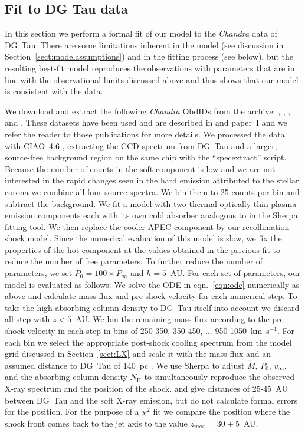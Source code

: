\subsection{Fit to DG Tau data}
In this section we perform a formal fit of our model to the \emph{Chandra} data of DG~Tau. There are some limitations inherent in the model (see discussion in Section~\ref{sect:modelassumptions}) and in the fitting process (see below), but the resulting best-fit model reproduces the observations with parameters that are in line with the observational limits discussed above and thus shows that our model is consistent with the data.

We download and extract the following \emph{Chandra} ObdIDs from the archive: , , , and . These datasets have been used and are described in \citet{2008A&A...478..797G,2008A&A...488L..13S} and paper~I and we refer the reader to those publications for more details. We processed the data with CIAO~4.6 \citep{2006SPIE.6270E..60F}, extracting the CCD spectrum from DG~Tau and a larger, source-free background region on the same chip with the ``specextract'' script. Because the number of counts in the soft component is low and we are not interested in the rapid changes seen in the hard emission attributed to the stellar corona \citep{2008A&A...478..797G} we combine all four source spectra. We bin them to 25 counts per bin and subtract the background. We fit a model with two thermal optically thin plasma emission components \citep[APEC][]{2012ApJ...756..128F} each with its own cold absorber analogous to \citep{2008A&A...478..797G} in the Sherpa fitting tool. We then replace the cooler APEC component by our recollimation shock model. Since the numerical evaluation of this model is slow, we fix the properties of the hot component at the values obtained in the privious fit to reduce the number of free parameters. To further reduce the number of parameters, we set $P_0 = 100\times P_\infty$ and $h=5$~AU. For each set of parameters, our model is evaluated as follows: We solve the ODE in eqn.~\ref{eqn:ode} numerically as above and calculate mass flux and pre-shock velocity for each numerical step. To take the high absorbing column density to DG~Tau itself into account we discard all step with $z<5$~AU. We bin the remaining mass flux according to the pre-shock velocity in each step in bins of 250-350, 350-450, ... 950-1050~km~s$^{-1}$. For each bin we select the appropriate post-shock cooling spectrum from the model grid discussed in Section~\ref{sect:LX} and scale it with the mass flux and an assumed distance to DG~Tau of 140~pc \citep{1994AJ....108.1872K}. We use Sherpa to adjust $\dot M$, $P_0$, $v_\infty$, and the absorbing column density $N_\textrm{H}$ to simultaneously reproduce the observed X-ray spectrum and the position of the shock. \citet{2008A&A...488L..13S} and \citet{2011ASPC..448..617G} give distances of 25-45~AU between DG~Tau and the soft X-ray emission, but do not calculate formal errors for the position. For the purpose of a $\chi^2$ fit we compare the position where the shock front comes back to the jet axis to the value $z_{max} = 30\pm5$~AU.

